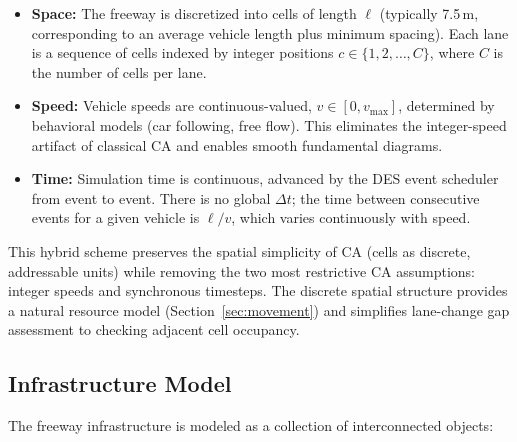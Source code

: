 \documentclass[review,number]{elsarticle} %
\begin{document}
\begin{itemize}
    \item \textbf{Space:} The freeway is discretized into cells of length $\ell$ (typically 7.5\,m, corresponding to an average vehicle length plus minimum spacing). Each lane is a sequence of cells indexed by integer positions $c \in \{1, 2, \ldots, C\}$, where $C$ is the number of cells per lane.

    \item \textbf{Speed:} Vehicle speeds are continuous-valued, $v \in [0, v_{\max}]$, determined by behavioral models (car following, free flow). This eliminates the integer-speed artifact of classical CA and enables smooth fundamental diagrams.

    \item \textbf{Time:} Simulation time is continuous, advanced by the DES event scheduler from event to event. There is no global $\Delta t$; the time between consecutive events for a given vehicle is $\ell / v$, which varies continuously with speed.
\end{itemize}

This hybrid scheme preserves the spatial simplicity of CA (cells as discrete, addressable units) while removing the two most restrictive CA assumptions: integer speeds and synchronous timesteps. The discrete spatial structure provides a natural resource model (Section~\ref{sec:movement}) and simplifies lane-change gap assessment to checking adjacent cell occupancy.

\subsection{Infrastructure Model}
\label{sec:infrastructure}

The freeway infrastructure is modeled as a collection of interconnected objects:
\end{document}
